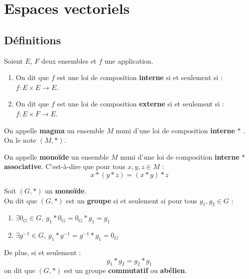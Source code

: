 \chapter{Espaces vectoriels}\label{chap:espaces_vectoriels}
\def\arraystretch{1}

\section{Définitions}
\begin{definition}
	Soient $E$, $F$ deux ensembles et $f$ une application.
	\begin{enumerate}
		\item On dit que $f$ est une loi de composition \textbf{interne} si et seulement si : $f : E \times E \to E$.
		\item On dit que $f$ est une loi de composition \textbf{externe} si et seulement si : $f : E \times F \to E$.
	\end{enumerate}
\end{definition}

\begin{definition}[Magma]
	On appelle \textbf{magma} un ensemble $M$ muni d'une loi de composition \textbf{interne} \og $*$ \fg. 
	\\
	On le note $(M, *)$.
\end{definition}

\begin{definition}
	On appelle \textbf{monoïde} un ensemble $M$ muni d'une loi de composition \textbf{interne} \og $*$ \fg \textbf{associative}. C'est-à-dire que pour tous $x, y, z \in M$ :
	\[ x * (y * z) = (x * y) * z \]
\end{definition}

\begin{definition}[Groupe]
	Soit $(G, *)$ un \textbf{monoïde}.
	\\ 
	On dit que $(G, *)$ est un \textbf{groupe} si et seulement si pour tous $g_1, g_2 \in G$ : 
    \begin{enumerate}
    		\item $\exists 0_G \in G,\ g_1 * 0_G = 0_G * g_1 = g_1$
    		\item $\exists g^{-1} \in G,\ g_1 * g^{-1} = g^{-1} * g_1 = 0_G$
    	\end{enumerate}
    \noindent De plus, si et seulement :
    \[ g_1 * g_2 = g_2 * g_1 \]
    on dit que $(G, *)$ est un groupe \textbf{commutatif} ou \textbf{abélien}.
\end{definition}

